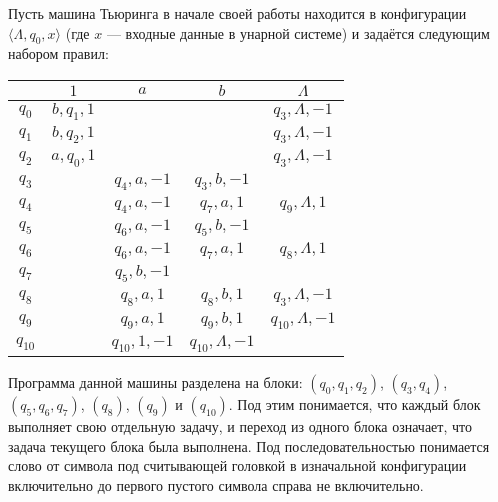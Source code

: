 \documentclass[a4paper,12pt]{article}
\newcommand {\gu} [1] {\guillemotleft#1\guillemotright}
\begin{document}
	Пусть машина Тьюринга в начале своей работы находится в конфигурации $\langle \Lambda, q_0, x\rangle$ (где $x$ --- входные данные в унарной системе) и задаётся следующим набором правил:
    \begin{center}
    \begin{tabular}{c||c|c|c|c}
    \boldmath & \boldmath $1$ & \boldmath $a$ & \boldmath $b$ & \boldmath $\Lambda$ \\
    \hline
    \hline
    \boldmath $q_0$ & $b, q_1, 1$ & & & $q_3, \Lambda, -1$\\
    \boldmath $q_1$ & $b, q_2, 1$ & & & $q_3, \Lambda, -1$\\
    \boldmath $q_2$ & $a, q_0, 1$ & & & $q_3, \Lambda, -1$\\
    \boldmath $q_3$ & & $q_4, a, -1$ & $q_3, b, -1$ & \\
    \boldmath $q_4$ & & $q_4, a, -1$ & $q_7, a, 1$ & $q_9, \Lambda, 1$\\
    \boldmath $q_5$ & & $q_6, a, -1$ & $q_5, b, -1$ & \\
    \boldmath $q_6$ & & $q_6, a, -1$ & $q_7, a, 1$ & $q_8, \Lambda, 1$\\
    \boldmath $q_7$ & & $q_5, b, -1$ & & \\
    \boldmath $q_8$ & & $q_8, a, 1$ & $q_8, b, 1$ & $q_3, \Lambda, -1$\\
    \boldmath $q_9$ & & $q_9, a, 1$ & $q_9, b, 1$ & $q_{10}, \Lambda, -1$\\
    \boldmath $q_{10}$ & & $q_{10}, 1, -1$ & $q_{10}, \Lambda, -1$ & \\
    \end{tabular}
    \end{center}
    \gu{Программа} данной машины разделена на \gu{блоки}: $(q_0, q_1, q_2)$, $(q_3, q_4)$, $(q_5, q_6, q_7)$, $(q_8)$, $(q_9)$ и $(q_{10})$. Под этим понимается, что каждый блок выполняет свою отдельную задачу, и переход из одного блока означает, что задача текущего блока была выполнена. Под \gu{последовательностью} понимается слово от символа под считывающей головкой в изначальной конфигурации включительно до первого пустого символа справа не включительно.
\end{document}
